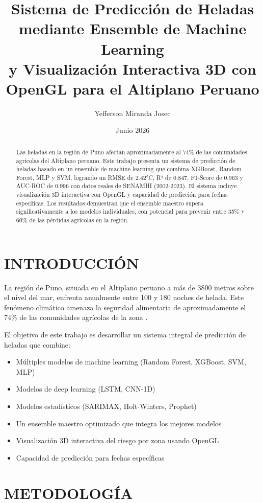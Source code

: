 \documentclass[11pt, a4paper]{article}
\title{Sistema de Predicción de Heladas mediante Ensemble de Machine Learning \\
       y Visualización Interactiva 3D con OpenGL para el Altiplano Peruano}
\author{Yefferson Miranda Josec}
\date{Junio 2026}
\begin{document}
\maketitle

\begin{abstract}
Las heladas en la región de Puno afectan aproximadamente al 74\% de las comunidades agrícolas del Altiplano peruano. Este trabajo presenta un sistema de predicción de heladas basado en un ensemble de machine learning que combina XGBoost, Random Forest, MLP y SVM, logrando un RMSE de 2.42°C, R² de 0.847, F1-Score de 0.963 y AUC-ROC de 0.996 con datos reales de SENAMHI (2002-2023). El sistema incluye visualización 3D interactiva con OpenGL y capacidad de predicción para fechas específicas. Los resultados demuestran que el ensemble maestro supera significativamente a los modelos individuales, con potencial para prevenir entre 35\% y 60\% de las pérdidas agrícolas en la región.
\end{abstract}

\section{INTRODUCCIÓN}

La región de Puno, situada en el Altiplano peruano a más de 3800 metros sobre el nivel del mar, enfrenta anualmente entre 100 y 180 noches de helada. Este fenómeno climático amenaza la seguridad alimentaria de aproximadamente el 74\% de las comunidades agrícolas de la zona \cite{senamhi2021}.

El objetivo de este trabajo es desarrollar un sistema integral de predicción de heladas que combine:
\begin{itemize}
    \item Múltiples modelos de machine learning (Random Forest, XGBoost, SVM, MLP)
    \item Modelos de deep learning (LSTM, CNN-1D)
    \item Modelos estadísticos (SARIMAX, Holt-Winters, Prophet)
    \item Un ensemble maestro optimizado que integra los mejores modelos
    \item Visualización 3D interactiva del riesgo por zona usando OpenGL
    \item Capacidad de predicción para fechas específicas
\end{itemize}

\section{METODOLOGÍA}
\end{document}
